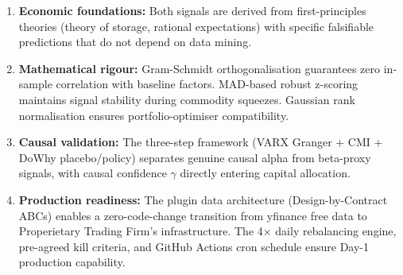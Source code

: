 \documentclass[12pt,a4paper]{article}
\begin{document}
\begin{enumerate}
  \item \textbf{Economic foundations:} Both signals are derived from first-principles theories (theory of storage, rational expectations) with specific falsifiable predictions that do not depend on data mining.
  \item \textbf{Mathematical rigour:} Gram-Schmidt orthogonalisation guarantees zero in-sample correlation with baseline factors. MAD-based robust z-scoring maintains signal stability during commodity squeezes. Gaussian rank normalisation ensures portfolio-optimiser compatibility.
  \item \textbf{Causal validation:} The three-step framework (VARX Granger + CMI + DoWhy placebo/policy) separates genuine causal alpha from beta-proxy signals, with causal confidence $\gamma$ directly entering capital allocation.
  \item \textbf{Production readiness:} The plugin data architecture (Design-by-Contract ABCs) enables a zero-code-change transition from yfinance free data to Properietary Trading Firm's infrastructure. The 4× daily rebalancing engine, pre-agreed kill criteria, and GitHub Actions cron schedule ensure Day-1 production capability.
\end{enumerate}
\end{document}
